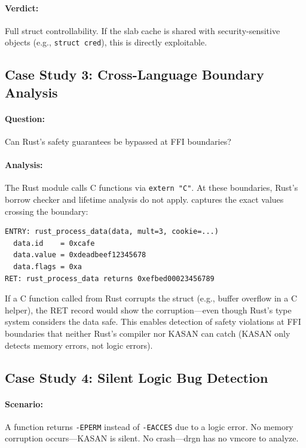\documentclass{ndss}
\begin{document}
\paragraph{Verdict:} Full struct controllability. If the slab cache is shared
with security-sensitive objects (e.g., \texttt{struct cred}), this is directly
exploitable.

\subsection{Case Study 3: Cross-Language Boundary Analysis}

\paragraph{Question:} Can Rust's safety guarantees be bypassed at FFI boundaries?

\paragraph{Analysis:} The Rust module calls C functions via \texttt{extern "C"}.
At these boundaries, Rust's borrow checker and lifetime analysis do not apply.
\toolname{} captures the exact values crossing the boundary:

\begin{lstlisting}[numbers=none]
ENTRY: rust_process_data(data, mult=3, cookie=...)
  data.id    = 0xcafe
  data.value = 0xdeadbeef12345678
  data.flags = 0xa
RET: rust_process_data returns 0xefbed00023456789
\end{lstlisting}

If a C function called from Rust corrupts the struct (e.g., buffer overflow in
a C helper), the RET record would show the corruption---even though Rust's type
system considers the data safe. This enables detection of safety violations at
FFI boundaries that neither Rust's compiler nor KASAN can catch (KASAN only
detects memory errors, not logic errors).

\subsection{Case Study 4: Silent Logic Bug Detection}

\paragraph{Scenario:} A function returns \texttt{-EPERM} instead of
\texttt{-EACCES} due to a logic error. No memory corruption occurs---KASAN is
silent. No crash---drgn has no vmcore to analyze.
\end{document}
